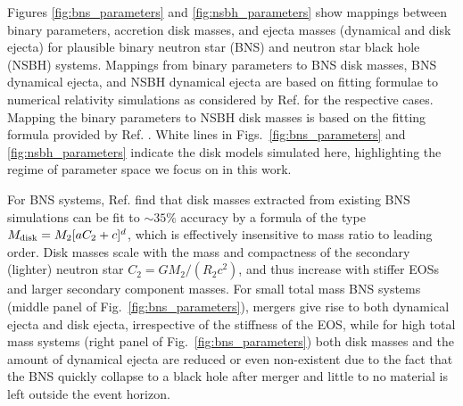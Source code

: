 Figures \ref{fig:bns_parameters} and \ref{fig:nsbh_parameters} show mappings between binary parameters, accretion disk masses, and ejecta masses (dynamical and disk ejecta) for plausible binary neutron star (BNS) and neutron star black hole (NSBH) systems. Mappings from binary parameters to BNS disk masses, BNS dynamical ejecta, and NSBH dynamical ejecta are based on fitting formulae to numerical relativity simulations as considered by Ref. \cite{kruger_2020} for the respective cases. Mapping the binary parameters to NSBH disk masses is based on the fitting formula provided by Ref. \cite{foucart_remnant_2018}. White lines in Figs.~\ref{fig:bns_parameters} and \ref{fig:nsbh_parameters} indicate the disk models simulated here, highlighting the regime of parameter space we focus on in this work.

For BNS systems, Ref. \cite{kruger_2020} find that disk masses extracted from existing BNS simulations can be fit to $\sim35\%$ accuracy by a formula of the type $M_{\rm disk}=M_2[aC_2 +c]^d$, which is effectively insensitive to mass ratio to leading order. Disk masses scale with the mass and compactness of the secondary (lighter) neutron star $C_2 = GM_2/(R_2c^2)$, and thus increase with stiffer EOSs and larger secondary component masses. For small total mass BNS systems (middle panel of Fig.~\ref{fig:bns_parameters}), mergers give rise to both dynamical ejecta and disk ejecta, irrespective of the stiffness of the EOS, while for high total mass systems (right panel of Fig.~\ref{fig:bns_parameters}) both disk masses and the amount of dynamical ejecta are reduced or even non-existent due to the fact that the BNS quickly collapse to a black hole after merger and little to no material is left outside the event horizon. 

